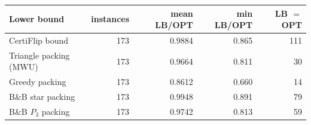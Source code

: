 \begin{tabular}{lrrrr}
\toprule
Lower bound & instances & mean LB/OPT & min LB/OPT & LB $=$ OPT\\
\midrule
CertiFlip bound & 173 & 0.9884 & 0.865 & 111\\
Triangle packing (MWU) & 173 & 0.9664 & 0.811 & 30\\
Greedy packing & 173 & 0.8612 & 0.660 & 14\\
B\&B star packing & 173 & 0.9948 & 0.891 & 79\\
B\&B $P_3$ packing & 173 & 0.9742 & 0.813 & 59\\
\bottomrule
\end{tabular}
